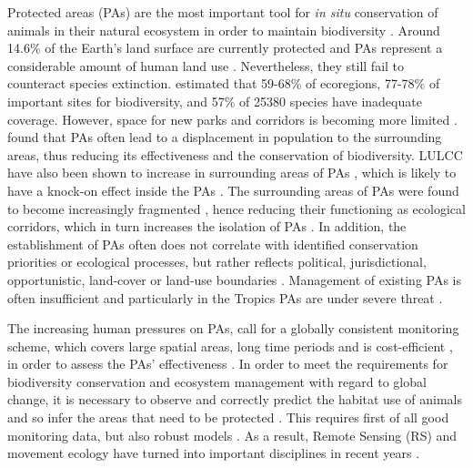 \documentclass[12pt,a4paper, twoside, english]{article}
\begin{document}
Protected areas (PAs) are the most important tool for \textit{in situ} conservation of animals in their natural ecosystem in order to maintain biodiversity \citep{Chape2005, Rodrigues2004}. Around 14.6\% of the Earth's land surface are currently protected \citep{Butchart2015} and PAs represent a considerable amount of human land use \citep{Chape2005, Foley2005}. Nevertheless, they still fail to counteract species extinction. \cite{Butchart2015} estimated that 59-68\% of ecoregions, 77-78\% of important sites for biodiversity, and 57\% of 25380 species have inadequate coverage. However, space for new parks and corridors is becoming more limited \citep{McKinney2002}. \cite{Wittemyer2008} found that PAs often lead to a displacement in population to the surrounding areas, thus reducing its effectiveness and the conservation of biodiversity. LULCC have also been shown to increase in surrounding areas of PAs \citep{Hansen2004}, which is likely to have a knock-on effect inside the PAs \citep{Willis2015}. The surrounding areas of PAs were found to become increasingly fragmented \citep{Nagendra2008b, Nagendra2009}, hence reducing their functioning as ecological corridors, which in turn increases the isolation of PAs \citep{DeFries2005}. In addition, the establishment of PAs often does not correlate with identified conservation priorities \citep{Chape2005} or ecological processes, but rather reflects political, jurisdictional, opportunistic, land-cover or land-use boundaries \citep{DeFries2010}. Management of existing PAs is often insufficient \citep{Leverington2010} and particularly in the Tropics PAs are under severe threat \citep{Chape2005}. 

The increasing human pressures on PAs, call for a globally consistent monitoring scheme, which covers large spatial areas, long time periods and is cost-efficient \citep{Nicholson2006, Henry2008, Scholes2008}, in order to assess the PAs' effectiveness \citep{Nagendra2013}. In order to meet the requirements for biodiversity conservation and ecosystem management with regard to global change, it is necessary to observe and correctly predict the habitat use of animals \citep{DeKnegt2011} and so infer the areas that need to be protected \citep{Widmann2015}. This requires first of all good monitoring data, but also robust models \citep{Honrado2016}. As a result, Remote Sensing (RS) and movement ecology have turned into important disciplines in recent years \citep{Turner2003a}.
\end{document}
